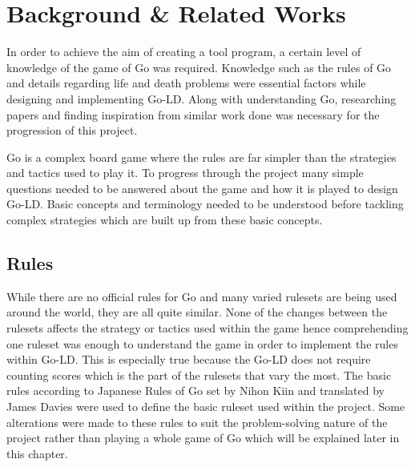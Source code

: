 \documentclass{l4proj}
\begin{document}
\chapter{Background \& Related Works}
In order to achieve the aim of creating a tool program, a certain level of knowledge of the game of Go was required. Knowledge such as the rules of Go and details regarding life and death problems were essential factors while designing and implementing Go-LD. Along with understanding Go, researching papers and finding inspiration from similar work done was necessary for the progression of this project.

Go is a complex board game where the rules are far simpler than the strategies and tactics used to play it.  To progress through the project many simple questions needed to be answered about the game and how it is played to design Go-LD. Basic concepts and terminology needed to be understood before tackling complex strategies which are built up from these basic concepts.

\section{Rules}

While there are no official rules for Go and many varied rulesets are being used around the world, they are all quite similar. None of the changes between the rulesets affects the strategy or tactics used within the game hence comprehending one ruleset was enough to understand the game in order to implement the rules within Go-LD. This is especially true because the Go-LD does not require counting scores which is the part of the rulesets that vary the most. The basic rules according to Japanese Rules of Go set by Nihon Kiin and translated by James Davies \cite{NihonKiinRules} were used to define the basic ruleset used within the project. Some alterations were made to these rules to suit the problem-solving nature of the project rather than playing a whole game of Go which will be explained later in this chapter.
\end{document}

